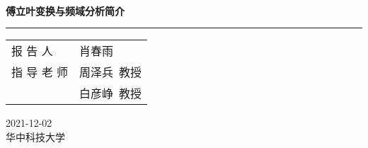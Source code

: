 \documentclass[UTF8]{ctexbeamer}
\begin{document}
    
\begin{frame}               %
    \thispagestyle{empty}
    \addtocounter{framenumber}{-1}

    \begin{center}
        \ {}
        \vspace{12mm}

        \begingroup         %
        \color{darkblue}\bfseries 傅立叶变换与频域分析简介
        \endgroup

        {\color{darkred}\rule{\textwidth}{0.7pt}}

        \vspace{3mm}

        \begin{tabular}{ll}
            报 \hfill 告 \hfill 人 & 肖春雨 \\
            指 \hfill 导 \hfill 老 \hfill 师 & 周泽兵\, 教授 \\
            & 白彦峥\, 教授
        \end{tabular}

        \vspace{10mm}

        2021-12-02 \\
        {\small 华中科技大学}
    \end{center}
\end{frame}
\end{document}
